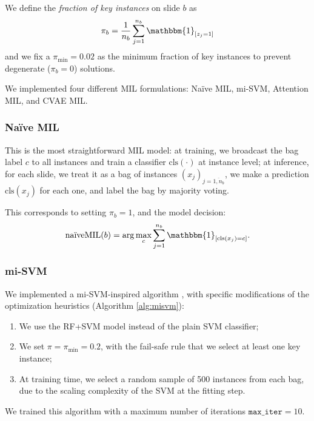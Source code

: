 \documentclass[12pt]{article}
\theoremstyle{paper}
\begin{document}
We define the \textit{fraction of key instances} on slide $b$ as 
\begin{equation}
    \pi_b = \frac{1}{n_{b}} \sum_{j=1}^{n_{b}} \mathbbm{1}_{\left[ z_j = 1 \right]}
\end{equation} and we fix a $\pi_{\text{min}} = 0.02$ as the minimum fraction of key instances to prevent degenerate ($\pi_b=0$) solutions.


 We implemented four different MIL formulations: Naïve MIL, mi-SVM, Attention MIL, and CVAE MIL.

\subsubsection{Naïve MIL}
This is the most straightforward MIL model: at training, we broadcast the bag label $c$ to all instances and train a classifier $\text{cls}(\cdot)$ at instance level; at inference, for each slide, we treat it as a bag of instances $(x_j)_{j=\overline{1,n_b}}$, we make a prediction $\text{cls}(x_j)$ for each one, and label the bag by majority voting.

This corresponds to setting $\pi_b = 1$, and the model decision:
\begin{equation}
    \text{naïveMIL}(b) = \arg\max_{c } \sum_{j=1}^{n_b} \mathbbm{1}_{\left[ \text{cls}(x_j) = c \right]}.
\end{equation}

 \subsubsection{mi-SVM}
We implemented a mi-SVM-inspired algorithm \cite{andrews2002misvm}, with specific modifications  of the optimization heuristics (Algorithm \ref{alg:misvm}):
\begin{enumerate}[label=(\roman*)]
    \item We use the RF+SVM model instead of the plain SVM classifier; 
    \item We set $\pi = \pi_{\text{min}} = 0.2$, with the fail-safe rule that we select at least one key instance;
    \item At training time, we select a random sample of 500 instances from each bag, due to the scaling complexity of the SVM at the fitting step.
\end{enumerate}

We trained this algorithm with a maximum number of iterations $\texttt{max\_iter} = 10$.
\end{document}
